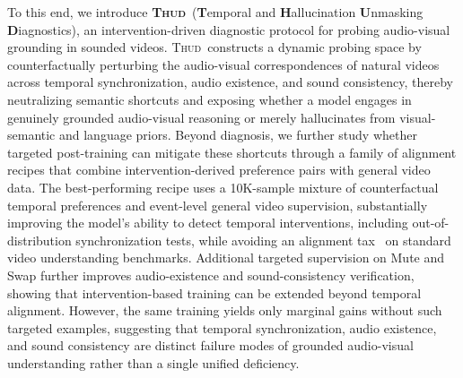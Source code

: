 \documentclass{llmxive}
\providecommand{\Thud}{\textsc{Thud}\xspace}
\begin{document}
To this end, we introduce \textbf{\Thud}~(\textbf{T}emporal and \textbf{H}allucination \textbf{U}nmasking \textbf{D}iagnostics), an intervention-driven diagnostic protocol for probing audio-visual grounding in sounded videos. \Thud~constructs a dynamic probing space by counterfactually perturbing the audio-visual correspondences of natural videos across temporal synchronization, audio existence, and sound consistency, thereby neutralizing semantic shortcuts and exposing whether a model engages in genuinely grounded audio-visual reasoning or merely hallucinates from visual-semantic and language priors. Beyond diagnosis, we further study whether targeted post-training can mitigate these shortcuts through a family of alignment recipes that combine intervention-derived preference pairs with general video data. The best-performing recipe uses a 10K-sample mixture of counterfactual temporal preferences and event-level general video supervision, substantially improving the model's ability to detect temporal interventions, including out-of-distribution synchronization tests, while avoiding an alignment tax~\cite{Askell2021AGL,DBLP:conf/nips/Ouyang0JAWMZASR22} on standard video understanding benchmarks. 
Additional targeted supervision on Mute and Swap further improves audio-existence and sound-consistency verification, showing that intervention-based training can be extended beyond temporal alignment.
However, the same training yields only marginal gains without such targeted examples, suggesting that temporal synchronization, audio existence, and sound consistency are distinct failure modes of grounded audio-visual understanding rather than a single unified deficiency.


\end{document}
